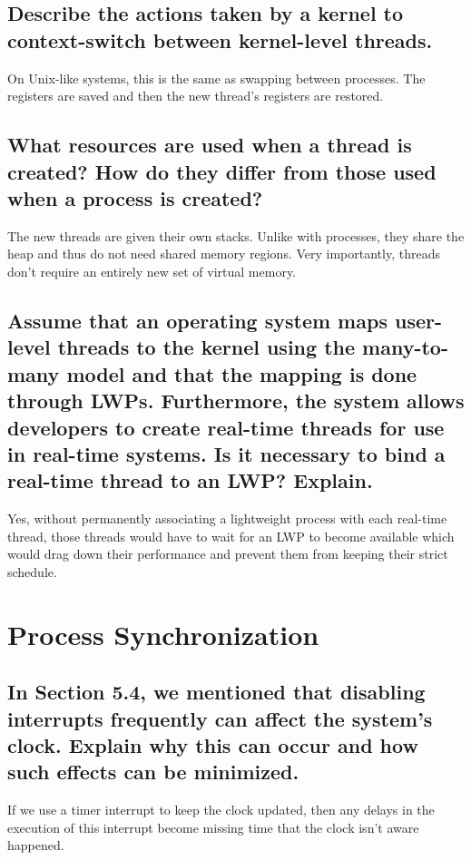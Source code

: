 \documentclass{book}%
\begin{document}
\section{Describe the actions taken by a kernel to context-switch between 
kernel-level threads.}
On Unix-like systems, this is the same as swapping between processes. The 
registers are saved and then the new thread's registers are restored.
\section{What resources are used when a thread is created? How do they differ 
from those used when a process is created?}
The new threads are given their own stacks. Unlike with processes, they share 
the heap and thus do not need shared memory regions. Very importantly, threads 
don't require an entirely new set of virtual memory.
\section{Assume that an operating system maps user-level threads to the kernel
using the many-to-many model and that the mapping is done through LWPs. 
Furthermore, the system allows developers to create real-time threads for use in
real-time systems. Is it necessary to bind a real-time thread to an LWP? 
Explain.}
Yes, without permanently associating a lightweight process with each real-time
thread, those threads would have to wait for an LWP to become available which
would drag down their performance and prevent them from keeping their strict
schedule.
\chapter{Process Synchronization}
\section{In Section 5.4, we mentioned that disabling interrupts frequently can
affect the system's clock. Explain why this can occur and how such effects can
be minimized.}
If we use a timer interrupt to keep the clock updated, then any delays in the
execution of this interrupt become missing time that the clock isn't aware
happened.
\end{document}
